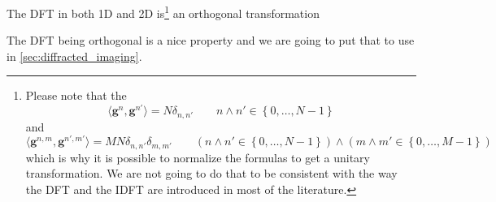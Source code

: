 \begin{Prop}
    The \ac{DFT} in both 1D and 2D is\footnote{Please note that the \begin{equation}
        \langle\boldsymbol{g}^n,\boldsymbol{g}^{n'}\rangle= N \delta_{n,n'} \qquad n \land n'\in \left\{0,\ldots,N-1\right\}
    \end{equation} and     \begin{equation}
        \langle\boldsymbol{g}^{n,m},\boldsymbol{g}^{n',m'}\rangle= MN \delta_{n,n'}\delta_{m,m'} \qquad (n \land n' \in \left\{0,\ldots,N-1\right\}) \land (m \land m' \in \left\{0,\ldots,M-1\right\})
    \end{equation} which is why it is possible to normalize the formulas to get a unitary transformation. We are not going to 
    do that to be consistent with the way the \ac{DFT} and the \ac{IDFT} are introduced in most of the literature.} an orthogonal transformation   
\end{Prop}

\begin{Rem}
    The \ac{DFT} being orthogonal is a nice property and we are going to put that to use in \cref{sec:diffracted_imaging}. 
\end{Rem}



























